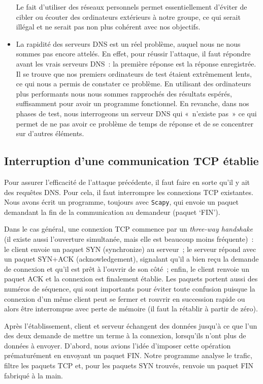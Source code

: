 \documentclass[a4paper, 12pt,twoside]{article}
\begin{document}
\begin{itemize}[label=\color{bleu303}\textbullet{}]
                Le fait d'utiliser des réseaux personnels permet essentiellement d'éviter de cibler ou écouter des ordinateurs extérieurs à notre groupe, ce qui serait illégal et ne serait pas non plus cohérent avec nos objectifs.

                \item La rapidité des serveurs DNS est un réel problème, auquel nous ne nous sommes pas encore attelés. En effet, pour réussir l'attaque, il faut répondre avant les vrais serveurs DNS~: la première réponse est la réponse enregistrée. Il se trouve que nos premiers ordinateurs de test étaient extrêmement lents, ce qui nous a permis de constater ce problème. En utilisant des ordinateurs plus performants nous nous sommes rapprochés des résultats espérés, suffisamment pour avoir un programme fonctionnel. En revanche, dans nos phases de test, nous interrogeons un serveur DNS qui «~n'existe pas~» ce qui permet de ne pas avoir ce problème de temps de réponse et de se concentrer sur d'autres éléments.
            \end{itemize}

        \subsection{Interruption d'une communication TCP établie}\label{tcpstop}

            Pour assurer l'efficacité de l'attaque précédente, il faut faire en sorte qu'il y ait des requêtes DNS. Pour cela, il faut interrompre les connexions TCP existantes. Nous avons écrit un programme, toujours avec \verb!Scapy!, qui envoie un paquet demandant la fin de la communication au demandeur (paquet ‘FIN').

            Dans le cas général, une connexion TCP commence par un \emph{three-way handshake} (il existe aussi l'ouverture simultanée, mais elle est beaucoup moins fréquente)~: le client envoie un paquet SYN (synchronize) au serveur~; le serveur répond avec un paquet SYN+ACK (acknowledgement), signalant qu'il a bien reçu la demande de connexion et qu'il est prêt à l'ouvrir de son côté~; enfin, le client renvoie un paquet ACK et la connexion est finalement établie. Les paquets portent aussi des numéros de séquence, qui sont importants pour éviter toute confusion puisque la connexion d'un même client peut se fermer et rouvrir en succession rapide ou alors être interrompue avec perte de mémoire (il faut la rétablir à partir de zéro).

            Après l'établissement, client et serveur échangent des données jusqu'à ce que l'un des deux demande de mettre un terme à la connexion, lorsqu'ils n'ont plus de données à envoyer. D'abord, nous avions l'idée d'imposer cette opération prématurément en envoyant un paquet FIN. Notre programme analyse le trafic, filtre les paquets TCP et, pour les paquets SYN trouvés, renvoie un paquet FIN fabriqué à la main.
\end{document}
